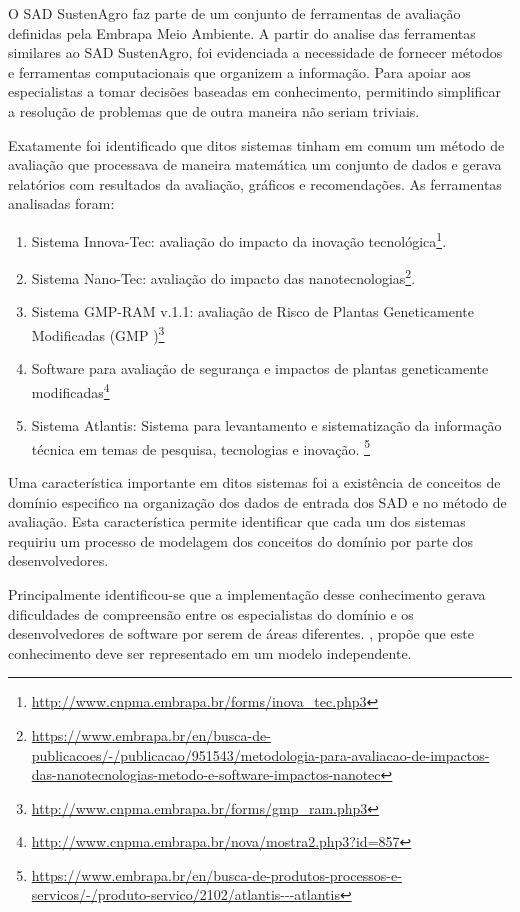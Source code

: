 O SAD SustenAgro faz parte de um conjunto de ferramentas de avaliação
definidas pela Embrapa Meio Ambiente. A partir do analise das ferramentas
similares ao SAD SustenAgro, foi evidenciada a necessidade de fornecer
métodos e ferramentas computacionais que organizem a informação. Para
apoiar aos especialistas a tomar decisões baseadas em conhecimento,
permitindo simplificar a resolução de problemas que de outra maneira
não seriam triviais. 

Exatamente foi identificado que ditos sistemas tinham em comum um
método de avaliação que processava de maneira matemática um conjunto
de dados e gerava relatórios com resultados da avaliação, gráficos
e recomendações. As ferramentas analisadas foram:
\begin{enumerate}
\item Sistema Innova-Tec: avaliação do impacto da inovação tecnológica\footnote{\url{http://www.cnpma.embrapa.br/forms/inova_tec.php3}}.
\item Sistema Nano-Tec: avaliação do impacto das nanotecnologias\footnote{\url{https://www.embrapa.br/en/busca-de-publicacoes/-/publicacao/951543/metodologia-para-avaliacao-de-impactos-das-nanotecnologias-metodo-e-software-impactos-nanotec} }.
\item Sistema GMP-RAM v.1.1: avaliação de Risco de Plantas Geneticamente
Modificadas (GMP )\footnote{\url{http://www.cnpma.embrapa.br/forms/gmp_ram.php3}}
\item Software para avaliação de segurança e impactos de plantas geneticamente
modificadas\footnote{\url{http://www.cnpma.embrapa.br/nova/mostra2.php3?id=857}}
\item Sistema Atlantis: Sistema para levantamento e sistematização da informação
técnica em temas de pesquisa, tecnologias e inovação. \footnote{\url{https://www.embrapa.br/en/busca-de-produtos-processos-e-servicos/-/produto-servico/2102/atlantis---atlantis}}
\end{enumerate}
Uma característica importante em ditos sistemas foi a existência de
conceitos de domínio especifico na organização dos dados de entrada
dos SAD e no método de avaliação. Esta característica permite identificar
que cada um dos sistemas requiriu um processo de modelagem dos conceitos
do domínio por parte dos desenvolvedores. 

Principalmente identificou-se que a implementação desse conhecimento
gerava dificuldades de compreensão entre os especialistas do domínio
e os desenvolvedores de software por serem de áreas diferentes. \citet{Evans:2003:DDT:861502},
propõe que este conhecimento deve ser representado em um modelo independente.


